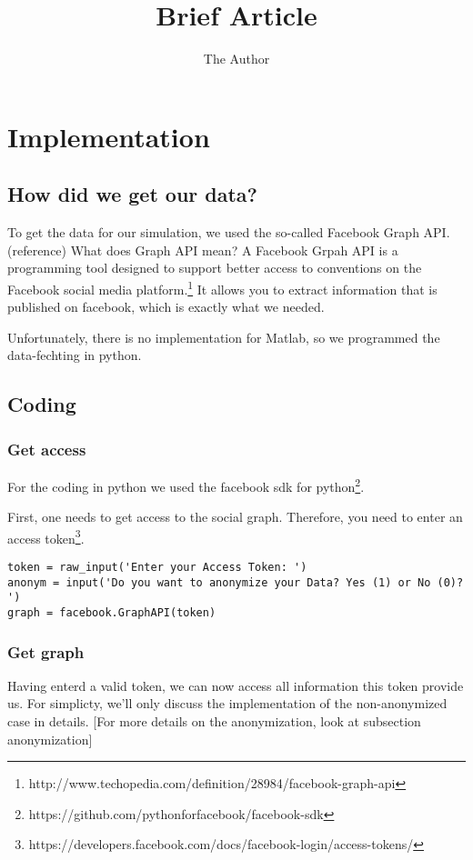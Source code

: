 \documentclass[11pt]{article} %
\title{Brief Article}
\author{The Author}
\begin{document}
\section{Implementation}

\subsection{How did we get our data?} 

To get the data for our simulation, we used the so-called Facebook Graph API. (reference) What does Graph API mean? 
A Facebook Grpah API is a programming tool designed to support better access to conventions on the Facebook social media platform.\footnote{http://www.techopedia.com/definition/28984/facebook-graph-api} It allows you to extract information that is published on facebook, which is exactly what we needed. 

Unfortunately, there is no implementation for Matlab, so we programmed the data-fechting in python.

\subsection{Coding}

\subsubsection{Get access}

For the coding in python we used the facebook sdk for python\footnote{https://github.com/pythonforfacebook/facebook-sdk}. 

First, one needs to get access to the social graph. Therefore, you need to enter an access token\footnote{https://developers.facebook.com/docs/facebook-login/access-tokens/}. 

\begin{lstlisting} 
token = raw_input('Enter your Access Token: ')
anonym = input('Do you want to anonymize your Data? Yes (1) or No (0)? ')
graph = facebook.GraphAPI(token)

\end{lstlisting}

\subsubsection{Get graph}

Having enterd a valid token, we can now access all information this token provide us.  For simplicty, we'll only discuss the implementation of the non-anonymized case in details. [For more details on the anonymization, look at subsection anonymization]
\end{document}
